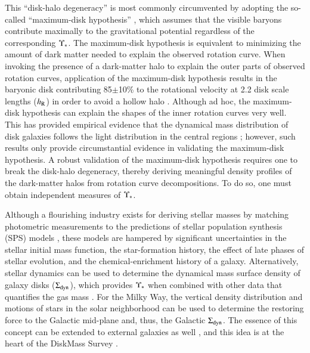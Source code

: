 \documentclass[traditabstract]{aa} %
\begin{document}
This ``disk-halo degeneracy'' is most commonly circumvented by adopting the
so-called ``maximum-disk hypothesis'' \citep{AlbadaSancisi1986}, which assumes
that the visible baryons contribute maximally to the gravitational potential
regardless of the corresponding $\Upsilon_\ast$.  The maximum-disk hypothesis is
equivalent to minimizing the amount of dark matter needed to explain the
observed rotation curve.  When invoking the presence of a dark-matter halo to
explain the outer parts of observed rotation curves, application of the
maximum-disk hypothesis results in the baryonic disk contributing 85$\pm$10\% to
the rotational velocity at 2.2 disk scale lengths ($h_{\rm R}$) in order to avoid a
hollow halo \citep{sackett1997}.  Although ad hoc, the maximum-disk
hypothesis can explain the shapes of the inner rotation curves very well.  This
has provided empirical evidence that the dynamical mass distribution of disk
galaxies follows the light distribution in the central regions
\citep[e.g.][]{sancisi2004,noordermeer2007,swaters2011,fraternali2011}; however,
such results only provide circumstantial evidence in validating the maximum-disk
hypothesis.  A robust validation of the maximum-disk hypothesis requires one to
break the disk-halo degeneracy, thereby deriving meaningful density profiles of
the dark-matter halos from rotation curve decompositions.  To do so, one must
obtain independent measures of $\Upsilon_\ast$.

Although a flourishing industry exists for deriving stellar masses by matching
photometric measurements to the predictions of stellar population synthesis
(SPS) models \citep[e.g.][]{belldejong2001, kauffmann2003, zibetti2009}, these
models are hampered by significant uncertainties in the stellar initial mass
function, the star-formation history, the effect of late phases of stellar
evolution, and the chemical-enrichment history of a galaxy. Alternatively,
stellar dynamics can be used to determine the dynamical mass surface density of galaxy
disks ($\Sigma_{\rm dyn}$), which provides $\Upsilon_\ast$ when combined with other data that
quantifies the gas mass \citep[e.g.,][hereafter
]{westfall2011b}.  For the Milky Way, the vertical
density distribution and motions of stars in the solar neighborhood
\citep[e.g.][]{kuijken1991} can be used to determine the restoring force to the
Galactic mid-plane and, thus, the Galactic $\Sigma_{\rm dyn}$.  The essence of this
concept can be extended to external galaxies as well \citep[e.g.][]{kruit1984},
and this idea is at the heart of the DiskMass Survey
.
\end{document}
